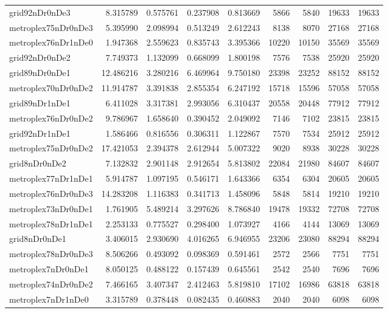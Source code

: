 \begin{longtable}{|l|r|r|r|r|r|r|r|r|}
grid92nDr0nDe3 & 8.315789 & 0.575761 & 0.237908 & 0.813669 & 5866 & 5840 & 19633 & 19633 \\
metroplex75nDr0nDe3 & 5.395990 & 2.098994 & 0.513249 & 2.612243 & 8138 & 8070 & 27168 & 27168 \\
metroplex76nDr1nDe0 & 1.947368 & 2.559623 & 0.835743 & 3.395366 & 10220 & 10150 & 35569 & 35569 \\
grid92nDr0nDe2 & 7.749373 & 1.132099 & 0.668099 & 1.800198 & 7576 & 7538 & 25920 & 25920 \\
grid89nDr0nDe1 & 12.486216 & 3.280216 & 6.469964 & 9.750180 & 23398 & 23252 & 88152 & 88152 \\
metroplex70nDr0nDe2 & 11.914787 & 3.391838 & 2.855354 & 6.247192 & 15718 & 15596 & 57058 & 57058 \\
grid89nDr1nDe1 & 6.411028 & 3.317381 & 2.993056 & 6.310437 & 20558 & 20448 & 77912 & 77912 \\
metroplex76nDr0nDe2 & 9.786967 & 1.658640 & 0.390452 & 2.049092 & 7146 & 7102 & 23815 & 23815 \\
grid92nDr1nDe1 & 1.586466 & 0.816556 & 0.306311 & 1.122867 & 7570 & 7534 & 25912 & 25912 \\
metroplex75nDr0nDe2 & 17.421053 & 2.394378 & 2.612944 & 5.007322 & 9020 & 8938 & 30228 & 30228 \\
grid8nDr0nDe2 & 7.132832 & 2.901148 & 2.912654 & 5.813802 & 22084 & 21980 & 84607 & 84607 \\
metroplex77nDr1nDe1 & 5.914787 & 1.097195 & 0.546171 & 1.643366 & 6354 & 6304 & 20605 & 20605 \\
metroplex76nDr0nDe3 & 14.283208 & 1.116383 & 0.341713 & 1.458096 & 5848 & 5814 & 19210 & 19210 \\
metroplex73nDr0nDe1 & 1.761905 & 5.489214 & 3.297626 & 8.786840 & 19478 & 19332 & 72708 & 72708 \\
metroplex78nDr1nDe1 & 2.253133 & 0.775527 & 0.298400 & 1.073927 & 4166 & 4144 & 13069 & 13069 \\
grid8nDr0nDe1 & 3.406015 & 2.930690 & 4.016265 & 6.946955 & 23206 & 23080 & 88294 & 88294 \\
metroplex78nDr0nDe3 & 8.506266 & 0.493092 & 0.098369 & 0.591461 & 2572 & 2566 & 7751 & 7751 \\
metroplex7nDr0nDe1 & 8.050125 & 0.488122 & 0.157439 & 0.645561 & 2542 & 2540 & 7696 & 7696 \\
metroplex74nDr0nDe2 & 7.466165 & 3.407347 & 2.412463 & 5.819810 & 17102 & 16986 & 63818 & 63818 \\
metroplex7nDr1nDe0 & 3.315789 & 0.378448 & 0.082435 & 0.460883 & 2040 & 2040 & 6098 & 6098 \\

\end{longtable}
